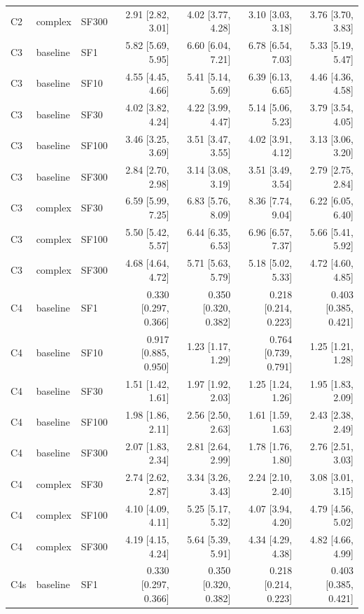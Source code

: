 \begin{longtable}{lllrrrr}
C2 & complex & SF300 & 2.91 [2.82, 3.01] & 4.02 [3.77, 4.28] & 3.10 [3.03, 3.18] & 3.76 [3.70, 3.83] \\
C3 & baseline & SF1 & 5.82 [5.69, 5.95] & 6.60 [6.04, 7.21] & 6.78 [6.54, 7.03] & 5.33 [5.19, 5.47] \\
C3 & baseline & SF10 & 4.55 [4.45, 4.66] & 5.41 [5.14, 5.69] & 6.39 [6.13, 6.65] & 4.46 [4.36, 4.58] \\
C3 & baseline & SF30 & 4.02 [3.82, 4.24] & 4.22 [3.99, 4.47] & 5.14 [5.06, 5.23] & 3.79 [3.54, 4.05] \\
C3 & baseline & SF100 & 3.46 [3.25, 3.69] & 3.51 [3.47, 3.55] & 4.02 [3.91, 4.12] & 3.13 [3.06, 3.20] \\
C3 & baseline & SF300 & 2.84 [2.70, 2.98] & 3.14 [3.08, 3.19] & 3.51 [3.49, 3.54] & 2.79 [2.75, 2.84] \\
C3 & complex & SF30 & 6.59 [5.99, 7.25] & 6.83 [5.76, 8.09] & 8.36 [7.74, 9.04] & 6.22 [6.05, 6.40] \\
C3 & complex & SF100 & 5.50 [5.42, 5.57] & 6.44 [6.35, 6.53] & 6.96 [6.57, 7.37] & 5.66 [5.41, 5.92] \\
C3 & complex & SF300 & 4.68 [4.64, 4.72] & 5.71 [5.63, 5.79] & 5.18 [5.02, 5.33] & 4.72 [4.60, 4.85] \\
C4 & baseline & SF1 & 0.330 [0.297, 0.366] & 0.350 [0.320, 0.382] & 0.218 [0.214, 0.223] & 0.403 [0.385, 0.421] \\
C4 & baseline & SF10 & 0.917 [0.885, 0.950] & 1.23 [1.17, 1.29] & 0.764 [0.739, 0.791] & 1.25 [1.21, 1.28] \\
C4 & baseline & SF30 & 1.51 [1.42, 1.61] & 1.97 [1.92, 2.03] & 1.25 [1.24, 1.26] & 1.95 [1.83, 2.09] \\
C4 & baseline & SF100 & 1.98 [1.86, 2.11] & 2.56 [2.50, 2.63] & 1.61 [1.59, 1.63] & 2.43 [2.38, 2.49] \\
C4 & baseline & SF300 & 2.07 [1.83, 2.34] & 2.81 [2.64, 2.99] & 1.78 [1.76, 1.80] & 2.76 [2.51, 3.03] \\
C4 & complex & SF30 & 2.74 [2.62, 2.87] & 3.34 [3.26, 3.43] & 2.24 [2.10, 2.40] & 3.08 [3.01, 3.15] \\
C4 & complex & SF100 & 4.10 [4.09, 4.11] & 5.25 [5.17, 5.32] & 4.07 [3.94, 4.20] & 4.79 [4.56, 5.02] \\
C4 & complex & SF300 & 4.19 [4.15, 4.24] & 5.64 [5.39, 5.91] & 4.34 [4.29, 4.38] & 4.82 [4.66, 4.99] \\
C4s & baseline & SF1 & 0.330 [0.297, 0.366] & 0.350 [0.320, 0.382] & 0.218 [0.214, 0.223] & 0.403 [0.385, 0.421] \\

\end{longtable}
